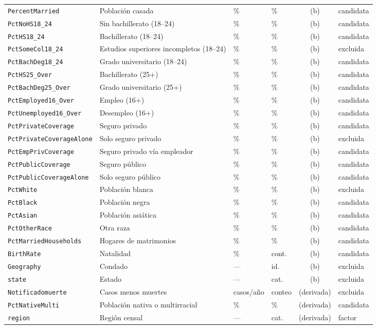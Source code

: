 {\begin{xltabular}{\linewidth}{l >{\raggedright\arraybackslash}X l l c l}
\texttt{PercentMarried} & Población casada & \% & \% & (b) & candidata \\
\texttt{PctNoHS18\_24} & Sin bachillerato (18–24) & \% & \% & (b) & candidata \\
\texttt{PctHS18\_24} & Bachillerato (18–24) & \% & \% & (b) & candidata \\
\texttt{PctSomeCol18\_24} & Estudios superiores incompletos (18–24) & \% & \% & (b) & excluida \\
\texttt{PctBachDeg18\_24} & Grado universitario (18–24) & \% & \% & (b) & candidata \\
\texttt{PctHS25\_Over} & Bachillerato (25+) & \% & \% & (b) & candidata \\
\texttt{PctBachDeg25\_Over} & Grado universitario (25+) & \% & \% & (b) & candidata \\
\texttt{PctEmployed16\_Over} & Empleo (16+) & \% & \% & (b) & candidata \\
\texttt{PctUnemployed16\_Over} & Desempleo (16+) & \% & \% & (b) & candidata \\
\texttt{PctPrivateCoverage} & Seguro privado & \% & \% & (b) & candidata \\
\texttt{PctPrivateCoverageAlone} & Solo seguro privado & \% & \% & (b) & excluida \\
\texttt{PctEmpPrivCoverage} & Seguro privado vía empleador & \% & \% & (b) & candidata \\
\texttt{PctPublicCoverage} & Seguro público & \% & \% & (b) & candidata \\
\texttt{PctPublicCoverageAlone} & Solo seguro público & \% & \% & (b) & candidata \\
\texttt{PctWhite} & Población blanca & \% & \% & (b) & excluida \\
\texttt{PctBlack} & Población negra & \% & \% & (b) & candidata \\
\texttt{PctAsian} & Población asiática & \% & \% & (b) & candidata \\
\texttt{PctOtherRace} & Otra raza & \% & \% & (b) & candidata \\
\texttt{PctMarriedHouseholds} & Hogares de matrimonios & \% & \% & (b) & candidata \\
\texttt{BirthRate} & Natalidad & \% & cont. & (b) & candidata \\
\texttt{Geography} & Condado & — & id. & (b) & excluida \\
\texttt{state} & Estado & — & cat. & (b) & excluida \\
\texttt{Notificadomuerte} & Casos menos muertes & casos/año & conteo & (derivada) & excluida \\
\texttt{PctNativeMulti} & Población nativa o multirracial & \% & \% & (derivada) & candidata \\
\texttt{region} & Región censal & — & cat. & (derivada) & factor \\
\end{xltabular}
}
